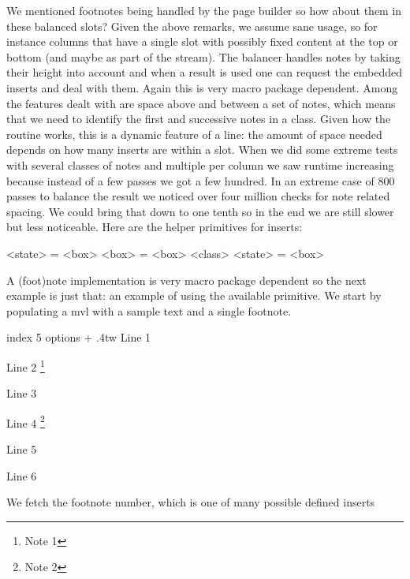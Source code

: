We mentioned footnotes being handled by the page builder so how about them in
these balanced slots? Given the above remarks, we assume sane usage, so for
instance columns that have a single slot with possibly fixed content at the top
or bottom (and maybe as part of the stream). The balancer handles notes by taking
their height into account and when a result is used one can request the embedded
inserts and deal with them. Again this is very macro package dependent. Among the
features dealt with are space above and between a set of notes, which means that
we need to identify the first and successive notes in a class. Given how the
routine works, this is a dynamic feature of a line: the amount of space needed
depends on how many inserts are within a slot. When we did some extreme tests
with several classes of notes and multiple per column we saw runtime increasing
because instead of a few passes we got a few hundred. In an extreme case of 800
passes to balance the result we noticed over four million checks for note related
spacing. We could bring that down to one tenth so in the end we are still slower
but less noticeable. Here are the helper primitives for inserts:

\starttyping[option=TEX]
<state> = \boxinserts <box>
<box>   = \vbalancedinsert <box> <class>
<state> = \boxinserts <box>
\stoptyping

A (foot)note implementation is very macro package dependent so the next example
is just that: an example of using the available primitive. We start by populating
a mvl with a sample text and a single footnote.

\startbuffer[populate]
\begingroup
    \forgetall
    \beginmvl
        index 5
        options \numexpr
            \ignoreprevdepthmvloptioncode
          + \discardtopmvloptioncode
        \relax
    \relax
        \hsize .4tw
        Line 1 \par Line 2 \footnote {Note 1} \par Line 3 \par
        Line 4 \footnote {Note 2} \par Line 5 \par Line 6 \par
    \endmvl
\endgroup
\stopbuffer

\typebuffer[populate][option=TEX]

We fetch the footnote number, which is one of many possible defined
inserts

\startbuffer[whatever]
\cdef{}%
\scratchcounter\currentnoteinsertionnumber
\stopbuffer

